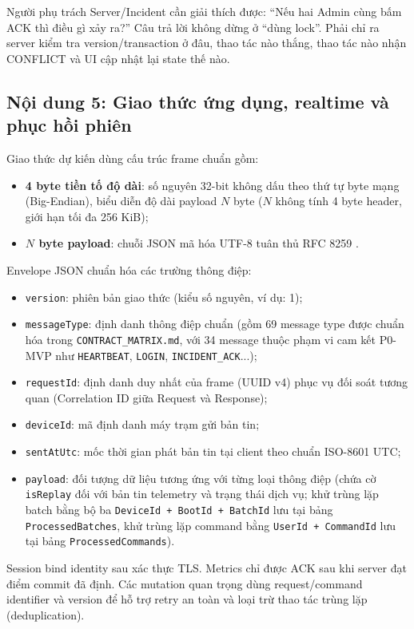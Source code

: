 \begin{vivabox}
Người phụ trách Server/Incident cần giải thích được: ``Nếu hai Admin cùng bấm ACK thì điều gì xảy ra?'' Câu trả lời không dừng ở ``dùng lock''. Phải chỉ ra server kiểm tra version/transaction ở đâu, thao tác nào thắng, thao tác nào nhận CONFLICT và UI cập nhật lại state thế nào.
\end{vivabox}

\subsection{Nội dung 5: Giao thức ứng dụng, realtime và phục hồi phiên}

Giao thức dự kiến dùng cấu trúc frame chuẩn gồm:
\begin{itemize}
    \item \textbf{4 byte tiền tố độ dài}: số nguyên 32-bit không dấu theo thứ tự byte mạng (Big-Endian), biểu diễn độ dài payload $N$ byte ($N$ không tính 4 byte header, giới hạn tối đa 256 KiB);
    \item \textbf{$N$ byte payload}: chuỗi JSON mã hóa UTF-8 tuân thủ RFC 8259 \cite{rfc8259}.
\end{itemize}
Envelope JSON chuẩn hóa các trường thông điệp:
\begin{itemize}
    \item \texttt{version}: phiên bản giao thức (kiểu số nguyên, ví dụ: 1);
    \item \texttt{messageType}: định danh thông điệp chuẩn (gồm 69 message type được chuẩn hóa trong \texttt{CONTRACT\_MATRIX.md}, với 34 message thuộc phạm vi cam kết P0-MVP như \texttt{HEARTBEAT}, \texttt{LOGIN}, \texttt{INCIDENT\_ACK}...);
    \item \texttt{requestId}: định danh duy nhất của frame (UUID v4) phục vụ đối soát tương quan (Correlation ID giữa Request và Response);
    \item \texttt{deviceId}: mã định danh máy trạm gửi bản tin;
    \item \texttt{sentAtUtc}: mốc thời gian phát bản tin tại client theo chuẩn ISO-8601 UTC;
    \item \texttt{payload}: đối tượng dữ liệu tương ứng với từng loại thông điệp (chứa cờ \texttt{isReplay} đối với bản tin telemetry và trạng thái dịch vụ; khử trùng lặp batch bằng bộ ba \texttt{DeviceId + BootId + BatchId} lưu tại bảng \texttt{ProcessedBatches}, khử trùng lặp command bằng \texttt{UserId + CommandId} lưu tại bảng \texttt{ProcessedCommands}).
\end{itemize}
Session bind identity sau xác thực TLS. Metrics chỉ được ACK sau khi server đạt điểm commit đã định. Các mutation quan trọng dùng request/command identifier và version để hỗ trợ retry an toàn và loại trừ thao tác trùng lặp (deduplication).

